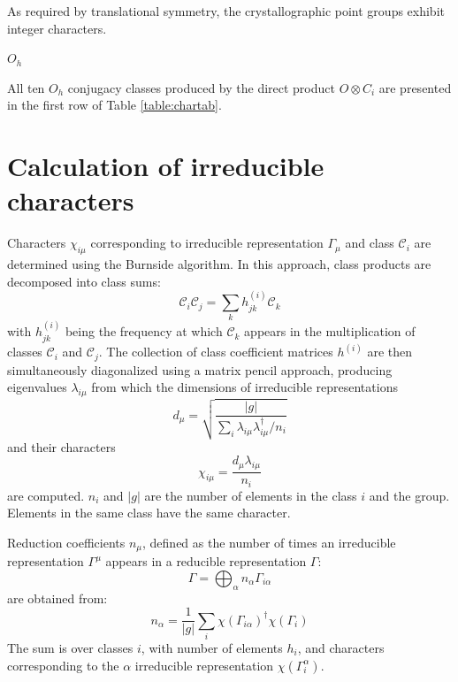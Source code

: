 \documentclass[twocolumn,showpacs,preprintnumbers,superscriptaddress,prb,floatfix,aps,10pt]{revtex4-1}
\newcommand*{\class}{\mathcal{C}}
\begin{document}
As required by translational symmetry, the crystallographic point groups exhibit integer characters.





$O_h$



All ten $O_h$ conjugacy classes produced by the direct product $O \otimes C_i$ are presented in the first row of Table \ref{table:chartab}.


\section{Calculation of irreducible characters}
\label{appendix:chartab}
Characters $\chi_{i\mu}$ corresponding to irreducible representation $\Gamma_\mu$ and class $\class_i$ are determined using the Burnside algorithm.\cite{burnside_theory_2010,mckay_construction_1970,unger_computing_2006,schneider_dixons_1990,dixon_high_1967} In this approach, class products are decomposed into class sums:
\begin{equation}
\label{eq:class_coefficients}
\class_i \class_j = \sum_k h_{jk}^{(i)} \class_k
\end{equation}
with $h_{jk}^{(i)}$ being the frequency at which $\class_k$ appears in the multiplication of classes $\class_i$ and $\class_j$. The collection of class coefficient matrices $h^{(i)}$ are then simultaneously diagonalized using a matrix pencil approach, producing eigenvalues $\lambda_{i\mu}$ from which the dimensions of irreducible representations
\begin{equation}
\label{eq:irrep_dimension}
d_\mu = \sqrt{ \frac{|g|}{\sum_i \lambda_{i\mu} \lambda^{\dag}_{i\mu} / n_i }  }
\end{equation}
and their characters
\begin{equation}
\label{eq:irrep_characters}
\chi_{i\mu} = \frac{d_\mu \lambda_{i\mu}}{n_i}
\end{equation}
are computed. $n_i$ and $|g|$ are the number of elements in the class $i$ and the group. Elements in the same class have the same character.

Reduction coefficients $n_\mu$, defined as the number of times an irreducible representation $\Gamma^\mu$ appears in a reducible representation $\Gamma$:
\begin{equation}
\label{eq:irrep_decomposition}
\Gamma = \bigoplus_\alpha n_\alpha \Gamma_{i\alpha}
\end{equation}
are obtained from:
\begin{equation}
\label{eq:irrep_decomposition_coefficients}
n_\alpha = \frac{1}{|g|} \sum_i \chi\left(\Gamma_{i\alpha}\right)^\dag \chi\left(\Gamma_i\right)
\end{equation}
The sum is over classes $i$, with number of elements $h_i$, and characters corresponding to the $\alpha$ irreducible representation $\chi(\Gamma_i^\alpha)$.
\end{document}
